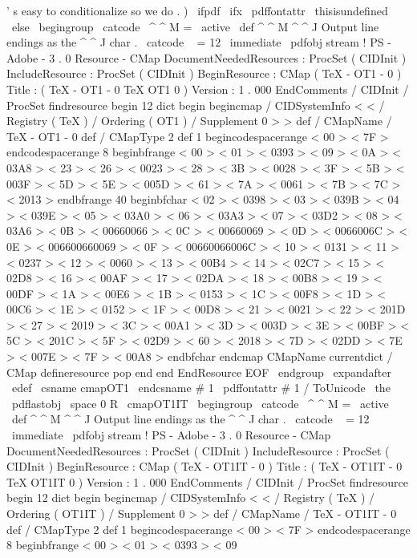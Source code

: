 {{{'
s
easy
to
conditionalize
so
we
do
.
)
\
ifpdf
\
ifx
\
pdffontattr
\
thisisundefined
\
else
\
begingroup
\
catcode
\
^
^
M
=
\
active
\
def
^
^
M
{
^
^
J
}
%
Output
line
endings
as
the
^
^
J
char
.
\
catcode
\
%
=
12
\
immediate
\
pdfobj
stream
{
%
!
PS
-
Adobe
-
3
.
0
Resource
-
CMap
%
%
DocumentNeededResources
:
ProcSet
(
CIDInit
)
%
%
IncludeResource
:
ProcSet
(
CIDInit
)
%
%
BeginResource
:
CMap
(
TeX
-
OT1
-
0
)
%
%
Title
:
(
TeX
-
OT1
-
0
TeX
OT1
0
)
%
%
Version
:
1
.
000
%
%
EndComments
/
CIDInit
/
ProcSet
findresource
begin
12
dict
begin
begincmap
/
CIDSystemInfo
<
<
/
Registry
(
TeX
)
/
Ordering
(
OT1
)
/
Supplement
0
>
>
def
/
CMapName
/
TeX
-
OT1
-
0
def
/
CMapType
2
def
1
begincodespacerange
<
00
>
<
7F
>
endcodespacerange
8
beginbfrange
<
00
>
<
01
>
<
0393
>
<
09
>
<
0A
>
<
03A8
>
<
23
>
<
26
>
<
0023
>
<
28
>
<
3B
>
<
0028
>
<
3F
>
<
5B
>
<
003F
>
<
5D
>
<
5E
>
<
005D
>
<
61
>
<
7A
>
<
0061
>
<
7B
>
<
7C
>
<
2013
>
endbfrange
40
beginbfchar
<
02
>
<
0398
>
<
03
>
<
039B
>
<
04
>
<
039E
>
<
05
>
<
03A0
>
<
06
>
<
03A3
>
<
07
>
<
03D2
>
<
08
>
<
03A6
>
<
0B
>
<
00660066
>
<
0C
>
<
00660069
>
<
0D
>
<
0066006C
>
<
0E
>
<
006600660069
>
<
0F
>
<
00660066006C
>
<
10
>
<
0131
>
<
11
>
<
0237
>
<
12
>
<
0060
>
<
13
>
<
00B4
>
<
14
>
<
02C7
>
<
15
>
<
02D8
>
<
16
>
<
00AF
>
<
17
>
<
02DA
>
<
18
>
<
00B8
>
<
19
>
<
00DF
>
<
1A
>
<
00E6
>
<
1B
>
<
0153
>
<
1C
>
<
00F8
>
<
1D
>
<
00C6
>
<
1E
>
<
0152
>
<
1F
>
<
00D8
>
<
21
>
<
0021
>
<
22
>
<
201D
>
<
27
>
<
2019
>
<
3C
>
<
00A1
>
<
3D
>
<
003D
>
<
3E
>
<
00BF
>
<
5C
>
<
201C
>
<
5F
>
<
02D9
>
<
60
>
<
2018
>
<
7D
>
<
02DD
>
<
7E
>
<
007E
>
<
7F
>
<
00A8
>
endbfchar
endcmap
CMapName
currentdict
/
CMap
defineresource
pop
end
end
%
%
EndResource
%
%
EOF
}
\
endgroup
\
expandafter
\
edef
\
csname
cmapOT1
\
endcsname
#
1
{
%
\
pdffontattr
#
1
{
/
ToUnicode
\
the
\
pdflastobj
\
space
0
R
}
%
}
%
%
%
\
cmapOT1IT
\
begingroup
\
catcode
\
^
^
M
=
\
active
\
def
^
^
M
{
^
^
J
}
%
Output
line
endings
as
the
^
^
J
char
.
\
catcode
\
%
=
12
\
immediate
\
pdfobj
stream
{
%
!
PS
-
Adobe
-
3
.
0
Resource
-
CMap
%
%
DocumentNeededResources
:
ProcSet
(
CIDInit
)
%
%
IncludeResource
:
ProcSet
(
CIDInit
)
%
%
BeginResource
:
CMap
(
TeX
-
OT1IT
-
0
)
%
%
Title
:
(
TeX
-
OT1IT
-
0
TeX
OT1IT
0
)
%
%
Version
:
1
.
000
%
%
EndComments
/
CIDInit
/
ProcSet
findresource
begin
12
dict
begin
begincmap
/
CIDSystemInfo
<
<
/
Registry
(
TeX
)
/
Ordering
(
OT1IT
)
/
Supplement
0
>
>
def
/
CMapName
/
TeX
-
OT1IT
-
0
def
/
CMapType
2
def
1
begincodespacerange
<
00
>
<
7F
>
endcodespacerange
8
beginbfrange
<
00
>
<
01
>
<
0393
>
<
09
}}}}
